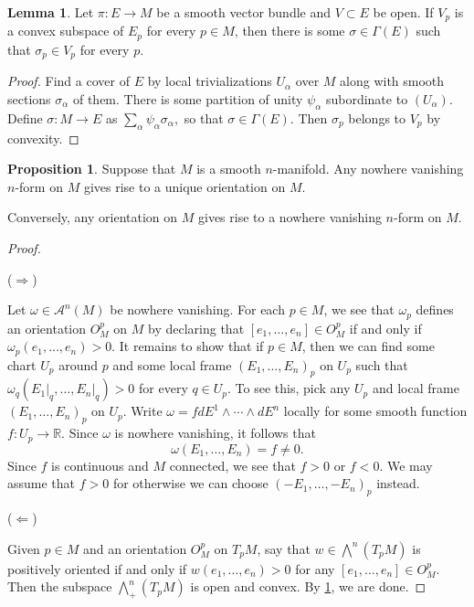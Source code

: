 \documentclass[10pt,letterpaper,cm]{nupset}
\theoremstyle{definition}
\theoremstyle{theorem}
\newtheorem{lemma}[definition]{Lemma}
\newtheorem{prop}[definition]{Proposition}
\theoremstyle{remark}
\newcommand{\R}{\mathbb R}
\newcommand{\1}{\mathbf{1}}
\newcommand{\0}{\vec 0}
\begin{document}
\begin{lemma}\label{convex}
Let $\pi : E \to M$ be a smooth vector bundle and $V \subset E$ be open. If $V_p$ is a convex subspace of $E_p$ for every $p\in M$, then there is some $\sigma \in \Gamma(E)$ such that $\sigma_p \in V_p$ for every $p$.
\end{lemma}
\begin{proof}
Find a cover of $E$ by local trivializations $U_{\alpha}$ over $M$ along with smooth sections $\sigma_{\alpha}$ of them. There is some partition of unity $\psi_{\alpha}$ subordinate to $\left(U_{\alpha}\right)$. Define $\sigma: M \to E$ as $\sum_{\alpha} \psi_{\alpha}\sigma_{\alpha} ,$ so that $\sigma \in \Gamma(E)$. Then $\sigma_p$ belongs to $V_p$ by convexity.
\end{proof}

\begin{prop}\label{nwv}
Suppose that $M$ is a smooth $n$-manifold. Any nowhere vanishing $n$-form on $M$ gives rise to a unique orientation on $M$. 

Conversely, any orientation on $M$ gives rise to a nowhere vanishing $n$-form on $M$.
\end{prop}
\begin{proof} $ $
\smallskip

($\Longrightarrow$)

Let $\omega \in \mathcal{A}^n(M)$ be nowhere vanishing. For each $p \in M$, we see that $\omega_p$ defines an orientation $O_M^p$ on $M$ by declaring that $[e_1, \ldots, e_n] \in  O_M^p$ if and only if $\omega_p(e_1, \ldots, e_n) >0$. It remains to show that if $p\in M$, then we can find some chart $U_p$ around $p$ and some local frame $\left(E_1, \ldots, E_n\right)_p$ on $U_p$ such that $\omega_q(E_1\bigr\rvert_q, \ldots, E_n\bigr\rvert_q) >0$ for every $q \in U_p$. To see this, pick any $U_p$ and local frame $\left(E_1, \ldots, E_n\right)_p$ on $U_p$. Write $\omega = fdE^1 \wedge \cdots \wedge dE^n$ locally for some smooth function $f: U_p \to \R$. Since $\omega$ is nowhere vanishing, it follows that $$\omega(E_1, \ldots, E_n) = f \ne 0.$$ Since $f$ is continuous and $M$ connected, we see that $f>0$ or $f<0$. We may assume that $f>0$ for otherwise we can choose $\left({-E_1}, \ldots, {-E_n}\right)_p$ instead. 

\medskip

($\Longleftarrow$)

Given $p\in M$ and an orientation $O_M^p$ on $T_pM$, say that $w \in \bigwedge^n(T_pM)$ is positively oriented if and only if $w(e_1, \ldots, e_n) >0$ for any $[e_1, \ldots, e_n] \in O_M^p$. Then the subspace $\bigwedge^n_+(T_pM)$ is open and convex. By \cref{convex}, we are done.
\end{proof}
\end{document}
